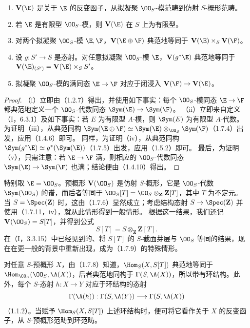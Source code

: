 \begin{enumerate}[label=(\roman*)]
\item $\mathbf V(\E)$ 是关于 $\E$ 的反变函子，从拟凝聚 $\OO_S$-模范畴到仿射 $S$-概形范畴。
\item 若 $\E$ 是有限型 $\OO_S$-模，则 $\mathbf V(\E)$ 在 $S$ 上为有限型。
\item 对两个拟凝聚 $\OO_S$-模 $\E,\F$，$\mathbf V(\E\oplus\F)$ 典范地等同于 $\mathbf V(\E)\times_S\mathbf V(\F)$。
\item 设 $g:S'\to S$ 是态射。对任意拟凝聚 $\OO_S$-模 $\E$，$\mathbf V(g^*\E)$ 典范地等同于
$\mathbf V(\E)_{(S')}=\mathbf V(\E)\times_SS'$。
\item 拟凝聚 $\OO_S$-模的满同态 $\E\to\F$ 对应于闭浸入 $\mathbf V(\F)\to\mathbf V(\E)$。
\end{enumerate}
\begin{proof}
（i）立即由（1.2.7）得出，并使用如下事实：每个 $\OO_S$-模同态 $\E\to\F$ 都典范地定义一个 $\OO_S$-代数同态 $\Sym(\E)\to\Sym(\F)$。
（ii）立即来自定义（I，6.3.1）及如下事实：若 $E$ 为有限型 $A$-模，则 $\Sym(E)$ 为有限型 $A$-代数。
为证明（iii），从典范同构
$\Sym(\E\oplus\F)\simeq\Sym(\E)\otimes_{\OO_S}\Sym(\F)$（1.7.4）出发，应用（1.4.6）即可。
同样，为证明（iv），从典范同构 $\Sym(g^*\E)\simeq g^*(\Sym(\E))$（1.7.5）出发，应用（1.5.2）即可。
最后，为证明（v），只需注意：若 $\E\to\F$ 满，则相应的 $\OO_S$-代数同态 $\Sym(\E)\to\Sym(\F)$ 也满；结论便由（1.4.10）得出。
\end{proof}

特别取 $\E=\OO_S$。预概形 $\mathbf V(\OO_S)$ 是仿射 $S$-概形，它是 $\OO_S$-代数 $\Sym(\OO_S)$ 的谱，而后者等同于
$\OO_S[T]=\OO_S\otimes_{\mathbf Z}\mathbf Z[T]$，其中 $T$ 为不定元。
当 $S=\Spec(\mathbf Z)$ 时，这由（1.7.6）显然成立；考虑结构态射
$S\to\Spec(\mathbf Z)$ 并使用（1.7.11，iv），就从此情形得到一般情形。
根据这一结果，我们还记 $\mathbf V(\OO_S)=S[T]$，并得到公式
\begin{equation}\tag{1.7.12.1}
S[T]=S\otimes_{\mathbf Z}\mathbf Z[T].
\end{equation}
在（I，3.3.15）中已经见到的、将 $S[T]$ 的 $S$-截面芽层与 $\OO_S$ 等同的结果，现在在更一般的背景中重新出现，成为（1.7.9）的特殊情形。

对任意 $S$-预概形 $X$，由（1.7.8）知道，$\Hom_S(X,S[T])$ 典范地等同于
$\Hom_{\OO_S}(\OO_S,\A(X))$，后者典范地同构于 $\Gamma(S,\A(X))$，所以带有环结构。此外，每个 $S$-态射 $h:X\to Y$ 对应于环结构的态射
\[
\Gamma(\A(h)):\Gamma(S,\A(Y))\longrightarrow\Gamma(S,\A(X))
\]
（1.1.2）。当赋予 $\Hom_S(X,S[T])$ 上述环结构时，便可将它看作关于 $X$ 的反变函子，从 $S$-预概形范畴到环范畴。

